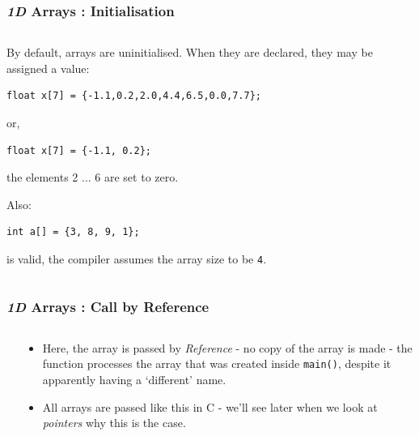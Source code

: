 

\begin{frame}[fragile]
\frametitle{{\em 1D} Arrays : Initialisation}
\begin{columns}

\begin{column}{0.45\textwidth}
By default, arrays are uninitialised.
When they are declared, they may be assigned a value:
{\small
\begin{verbatim}
float x[7] = {-1.1,0.2,2.0,4.4,6.5,0.0,7.7};
\end{verbatim}
}
or,
{\small
\begin{verbatim}
float x[7] = {-1.1, 0.2};
\end{verbatim}
}
the elements 2 ... 6 are set to zero.

Also:
{\small
\begin{verbatim}
int a[] = {3, 8, 9, 1};
\end{verbatim}
}
is valid, the compiler assumes the array size to be \verb^4^.
\end{column}

\pause
{}

\end{columns}
\end{frame}



\begin{frame}[fragile]
\frametitle{{\em 1D} Arrays : Call by Reference}
\begin{columns}

\begin{column}{0.55\textwidth}

\end{column}

\begin{column}{0.35\textwidth}
\begin{itemize}
\item Here, the array is passed by {\em Reference} - no copy of
the array is made - the function processes the array that was created inside \verb^main()^, despite
it apparently having a `different' name.
\item All arrays are passed like this in C - we'll see later when we look at {\em pointers} why this is the case.
\end{itemize}
\end{column}


\end{columns}
\end{frame}




